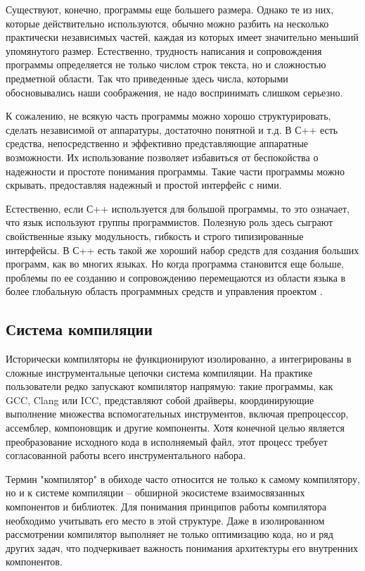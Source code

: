 Существуют, конечно, программы еще большего размера. Однако те из них, которые действительно используются, обычно можно разбить на несколько практически независимых частей, каждая из которых имеет значительно меньший упомянутого размер. Естественно, трудность написания и сопровождения программы определяется не только числом строк текста, но и сложностью предметной области. Так что приведенные здесь числа, которыми обосновывались наши соображения, не надо воспринимать слишком серьезно.

К сожалению, не всякую часть программы можно хорошо структурировать, сделать независимой от аппаратуры, достаточно понятной и т.д. В С++ есть средства, непосредственно и эффективно представляющие аппаратные возможности. Их использование позволяет избавиться от беспокойства о надежности и простоте понимания программы. Такие части программы можно скрывать, предоставляя надежный и простой интерфейс с ними.

Естественно, если С++ используется для большой программы, то это означает, что язык используют группы программистов. Полезную роль здесь сыграют свойственные языку модульность, гибкость и строго типизированные интерфейсы. В С++ есть такой же хороший набор средств для создания больших программ, как во многих языках. Но когда программа становится еще больше, проблемы по ее созданию и сопровождению перемещаются из области языка в более глобальную область программных средств и управления проектом \cite{StroustrupCpp}.


\subsection{Система компиляции}

Исторически компиляторы не функционируют изолированно, а интегрированы в сложные инструментальные цепочки система компиляции. На практике пользователи редко запускают компилятор напрямую: такие программы, как GCC, Clang или ICC, представляют собой драйверы, координирующие выполнение множества вспомогательных инструментов, включая препроцессор, ассемблер, компоновщик и другие компоненты. Хотя конечной целью является преобразование исходного кода в исполняемый файл, этот процесс требует согласованной работы всего инструментального набора.

Термин "компилятор" в обиходе часто относится не только к самому компилятору, но и к системе компиляции -- обширной экосистеме взаимосвязанных компонентов и библиотек. Для понимания принципов работы компилятора необходимо учитывать его место в этой структуре. Даже в изолированном рассмотрении компилятор выполняет не только оптимизацию кода, но и ряд других задач, что подчеркивает важность понимания архитектуры его внутренних компонентов.

